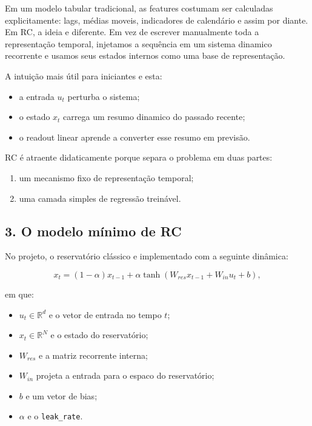 \documentclass[12pt]{article}
\providecommand{\tightlist}{%
          \setlength{\itemsep}{0pt}\setlength{\parskip}{0pt}}
\begin{document}
Em um modelo tabular tradicional, as features costumam ser calculadas explicitamente: lags, médias moveis, indicadores de calendário e assim por diante. Em RC, a ideia e diferente. Em vez de escrever manualmente toda a representação temporal, injetamos a sequência em um sistema dinamico recorrente e usamos seus estados internos como uma base de representação.

A intuição mais útil para iniciantes e esta:

\begin{itemize}
\tightlist
\item
  a entrada \(u_t\) perturba o sistema;
\item
  o estado \(x_t\) carrega um resumo dinamico do passado recente;
\item
  o readout linear aprende a converter esse resumo em previsão.
\end{itemize}

RC é atraente didaticamente porque separa o problema em duas partes:

\begin{enumerate}
\def\labelenumi{\arabic{enumi}.}
\tightlist
\item
  um mecanismo fixo de representação temporal;
\item
  uma camada simples de regressão treinável.
\end{enumerate}

\subsection{3. O modelo mínimo de RC}\label{3-o-modelo-muxednimo-de-rc}

No projeto, o reservatório clássico e implementado com a seguinte dinâmica:

\[
x_t = (1 - \alpha) x_{t-1} + \alpha \tanh(W_{res} x_{t-1} + W_{in} u_t + b),
\]

em que:

\begin{itemize}
\tightlist
\item
  \(u_t \in \mathbb{R}^d\) e o vetor de entrada no tempo \(t\);
\item
  \(x_t \in \mathbb{R}^N\) e o estado do reservatório;
\item
  \(W_{res}\) e a matriz recorrente interna;
\item
  \(W_{in}\) projeta a entrada para o espaco do reservatório;
\item
  \(b\) e um vetor de bias;
\item
  \(\alpha\) e o \texttt{leak\_rate}.
\end{itemize}
\end{document}
